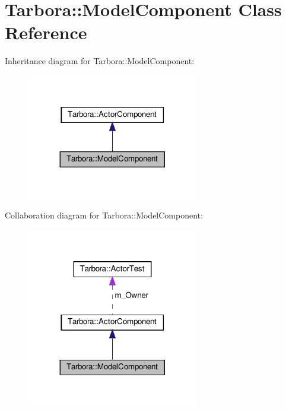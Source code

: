 \hypertarget{classTarbora_1_1ModelComponent}{}\section{Tarbora\+:\+:Model\+Component Class Reference}
\label{classTarbora_1_1ModelComponent}


Inheritance diagram for Tarbora\+:\+:Model\+Component\+:\nopagebreak
\begin{figure}[H]
\begin{center}
\leavevmode
\includegraphics[width=212pt]{classTarbora_1_1ModelComponent__inherit__graph}
\end{center}
\end{figure}


Collaboration diagram for Tarbora\+:\+:Model\+Component\+:\nopagebreak
\begin{figure}[H]
\begin{center}
\leavevmode
\includegraphics[width=212pt]{classTarbora_1_1ModelComponent__coll__graph}
\end{center}
\end{figure}
